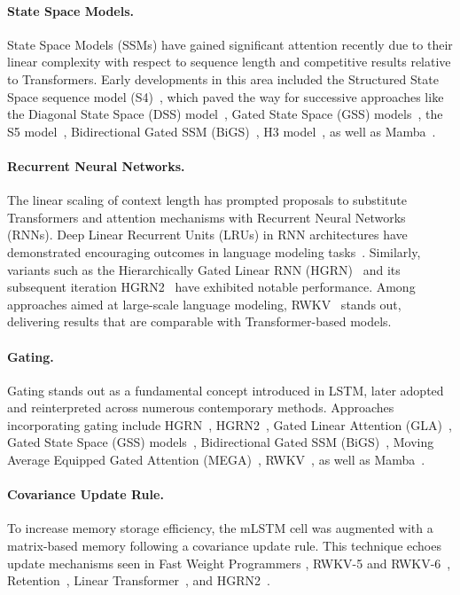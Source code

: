 \paragraph{State Space Models.} State Space Models (SSMs) have gained significant attention recently due to their linear complexity with respect to sequence length and competitive results relative to Transformers. Early developments in this area included the Structured State Space sequence model (S4)~\citep{Gu:21}, which paved the way for successive approaches like the Diagonal State Space (DSS) model~\citep{Gupta:22}, Gated State Space (GSS) models~\citep{Mehta:22}, the S5 model~\citep{Smith:22}, Bidirectional Gated SSM (BiGS)~\citep{Wang:22}, H3 model~\citep{Fu:23}, as well as Mamba~\citep{Gu:24arxiv}.

\paragraph{Recurrent Neural Networks.} The linear scaling of context length has prompted proposals to substitute Transformers and attention mechanisms with Recurrent Neural Networks (RNNs). Deep Linear Recurrent Units (LRUs) in RNN architectures have demonstrated encouraging outcomes in language modeling tasks~\citep{Orvieto:23, De:24arxiv}. Similarly, variants such as the Hierarchically Gated Linear RNN (HGRN)~\citep{Qin:23} and its subsequent iteration HGRN2~\citep{Qin:24arxiv} have exhibited notable performance. Among approaches aimed at large-scale language modeling, RWKV~\citep{Peng:23arxivshort,Peng:24arxivshort} stands out, delivering results that are comparable with Transformer-based models.

\paragraph{Gating.}
Gating stands out as a fundamental concept introduced in LSTM, later adopted and reinterpreted across numerous contemporary methods. Approaches incorporating gating include HGRN~\citep{Qin:23}, HGRN2~\citep{Qin:24arxiv}, Gated Linear Attention (GLA)~\citep{Yang:23arxiv}, Gated State Space (GSS) models~\citep{Mehta:22}, Bidirectional Gated SSM (BiGS)~\citep{Wang:22}, Moving Average Equipped Gated Attention (MEGA)~\citep{Ma:22}, RWKV~\citep{Peng:23arxivshort}, as well as Mamba~\citep{Gu:24arxiv}.

\paragraph{Covariance Update Rule.} To increase memory storage efficiency, the mLSTM cell was augmented with a matrix-based memory following a covariance update rule. This technique echoes update mechanisms seen in Fast Weight Programmers \citep{Schmidhuber:92ncfastweights,Schlag:21}, RWKV-5 and RWKV-6~\citep{Peng:24arxivshort}, Retention~\citep{Sun:23arxiv}, Linear Transformer~\citep{Katharopoulos:20}, and HGRN2~\citep{Qin:24arxiv}.

